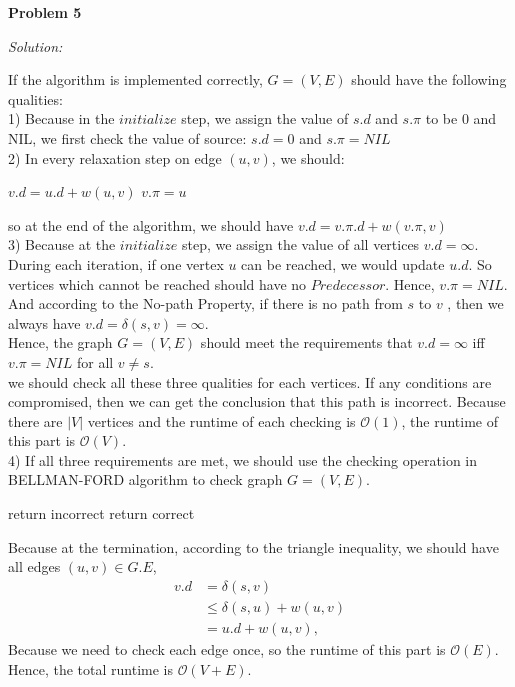 \documentclass[12pt,letterpaper]{article}
\def\pp{\par\noindent}
\newcommand{\problem}[1]{ \bigskip \pp \textbf{Problem #1}\par}
\newcommand{\solution}{\textit{Solution:}\par}
\begin{document}
\problem{5}
\solution
If the algorithm is implemented correctly, $G = (V,E)$ should have the following qualities: \\
1) Because in the $initialize$ step, we assign the value of $s.d$ and $s. \pi$ to be 0 and NIL, we first check the value of source: $s.d = 0$ and $s. \pi = NIL$ \\
2) In every relaxation step on edge $(u,v)$, we should: \\
\begin{algorithm}[H]
  {
	$v.d = u.d + w(u,v)$ \;
	$v.\pi = u $ \;	
	}
\end{algorithm}
so at the end of the algorithm, we should have $v.d = v. \pi.d + w(v. \pi, v) $ \\
3) Because at the $initialize$ step, we assign the value of all vertices $v.d = \infty$. During each iteration, if one vertex $u$ can be reached, we would update $u.d$. So vertices which cannot be reached should have no $Predecessor$. Hence, $v. \pi = NIL$. And according to the No-path Property, if there is no path from $s$ to $v$ , then we always have $v.d = \delta(s,v) = \infty $. \\
Hence, the graph $G=(V,E)$ should meet the requirements that $v.d = \infty$ iff $v. \pi = NIL$ for all $v \neq s$. \\
we should check all these three qualities for each vertices. If any conditions are compromised, then we can get the conclusion that this path is incorrect. Because there are $|V|$ vertices and the runtime of each checking is $\mathcal{O}(1)$, the runtime of this part is $\mathcal{O}(V)$. \\
4) If all three requirements are met, we should use the checking operation in BELLMAN-FORD algorithm to check graph $G = (V,E)$.  \\
\begin{algorithm}[H]
{
  {
	return incorrect \;
	}
}
   return correct \;
\end{algorithm}
Because at the termination, according to the triangle inequality, we should have all edges $(u,v) \in G.E$, 
\begin{align*}
v.d &= \delta (s,v) \\
&\le \delta (s,u) + w(u,v) \\
&= u.d + w(u,v),
\end{align*}
Because we need to check each edge once, so the runtime of this part is $\mathcal{O}(E)$. Hence, the total runtime is $\mathcal{O}(V+E)$. \\
\end{document}
